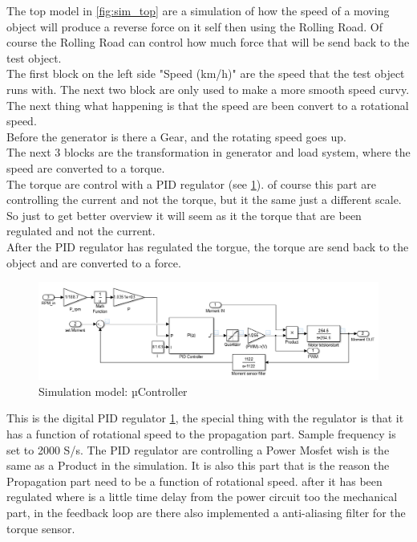The top model in \ref{fig:sim_top} are a simulation of how the speed of a moving object will produce a reverse force on it self then using the Rolling Road. Of course the Rolling Road can control how much force that will be send back to the test object.\\
The first block on the left side "Speed (km/h)" are the speed that the test object runs with. The next two block are only used to make a more smooth speed curvy.\\
The next thing what happening is that the speed are been convert to a rotational speed.\\
Before the generator is there a Gear, and the rotating speed goes up.\\
The next 3 blocks are the transformation in generator and load system, where the speed are converted to a torque.\\
The torque are control with a PID regulator (see \ref{fig:sim_PSOC}). of course this part are controlling the current and not the torque, but it the same just a different scale. So just to get better overview it will seem as it the torque that are been regulated and not the current.\\ 
After the PID regulator has regulated the torgue, the torque are send back to the object and are converted to a force.   

\begin{figure}[H]
	\centering
	\includegraphics [width=6in]{Hardware/Pictures/simulation_uController.PNG}
	\caption{Simulation model: µController}
	\label{fig:sim_PSOC}
\end{figure}  

This is the digital PID regulator \ref{fig:sim_PSOC}, the special thing with the regulator is that it has a function of rotational speed to the propagation part. Sample frequency is set to 2000 S/s. The PID regulator are controlling a Power Mosfet wish is the same as a Product in the simulation. It is also this part that is the reason the Propagation part need to be a function of rotational speed. after it has been regulated where is a little time delay from the power circuit too the mechanical part, in the feedback loop are there also implemented a anti-aliasing filter for the torque sensor.  
